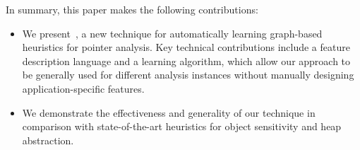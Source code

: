 In summary, this paper makes the following contributions:
\begin{itemize}
\item We present~\ourtool, a new technique for automatically learning graph-based heuristics for pointer analysis.
Key technical contributions include a feature description language and a learning algorithm, which allow our approach to be generally used for different analysis instances without manually designing application-specific features.
\item We demonstrate the effectiveness and generality of our technique in comparison with state-of-the-art heuristics for object sensitivity and heap abstraction.

%
\end{itemize}

































